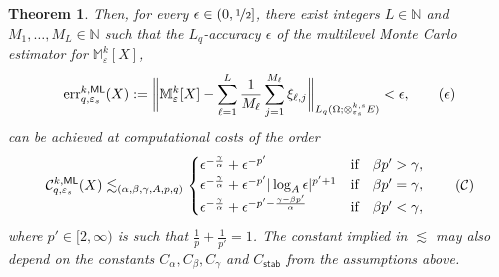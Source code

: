 \documentclass[reqno]{amsart}
\numberwithin{equation}{section}
\newcommand{\bbM}{\mathbb{M}}
\newcommand{\bbN}{\mathbb{N}}
\newcommand{\cC}{\mathcal{C}}
\newcommand{\xkseps}{\otimes^{k,s}_{\varepsilon_s}}
\newcommand{\Mk}{\bbM^k_\varepsilon}
\newcommand{\eps}{\varepsilon}
\newtheorem{theorem}[lemma]{Theorem}
\theoremstyle{remark}
\theoremstyle{definition}
\begin{document}
\begin{theorem}
	Then, for every $\epsilon\in(0,\nicefrac{1}{2}]$, 
	there exist integers 
	$L\in\bbN$ 
	and 
	$M_1,\ldots,M_L \in \bbN$ such 
	that the $L_q$-accuracy $\epsilon$ of 
	the multilevel Monte Carlo 
	estimator for $\Mk[X]$, 
	\begin{equation}\label{eq:epsilon} 
	\mathrm{err}^{k, \sf ML}_{q,\eps_s}(X)
	:=  
	\biggl\| 
	\Mk[X] 
	-
	\sum_{\ell = 1}^{L} 
	\frac{1}{M_\ell} 
	\sum_{j=1}^{M_\ell}  
	\xi_{\ell,j}
	\biggr\|_{L_q(\Omega;\xkseps E)} 
	<\epsilon , 
	\tag{$\epsilon$}
	\end{equation} 
	can be achieved at computational 
	costs of the order 
	\begin{equation}\label{eq:cC} 
	\cC^{k, \sf ML}_{q,\eps_s}(X)
	\lesssim_{(\alpha,\beta,\gamma,A,p,q)}  
	\begin{cases} 
	\epsilon^{-\frac{\gamma}{\alpha}} 
	+ 
	\epsilon^{-p'}  
	& \text{if}\quad \beta p' > \gamma, 
	\\
	\epsilon^{-\frac{\gamma}{\alpha}} 
	+ 
	\epsilon^{-p'} 
	|\log_A \epsilon|^{p'+1} 
	&\text{if}\quad \beta p' = \gamma, 
	\\
	\epsilon^{-\frac{\gamma}{\alpha}} 
	+ 
	\epsilon^{-p' - \frac{\gamma - \beta p' }{\alpha}} 
	& \text{if}\quad 
	\beta p' < \gamma, 
	\end{cases}
	\tag{$\cC$} 
	\end{equation}
	where $p'\in[2,\infty)$ is such that 
	$\tfrac{1}{p} + \tfrac{1}{p'} = 1$. 
	The constant implied in $\lesssim$ may also 
	depend on the constants $C_\alpha,C_\beta,C_\gamma$ 
	and $C_{\mathsf{stab}}$ from the assumptions above. 
\end{theorem} 
\end{document}
